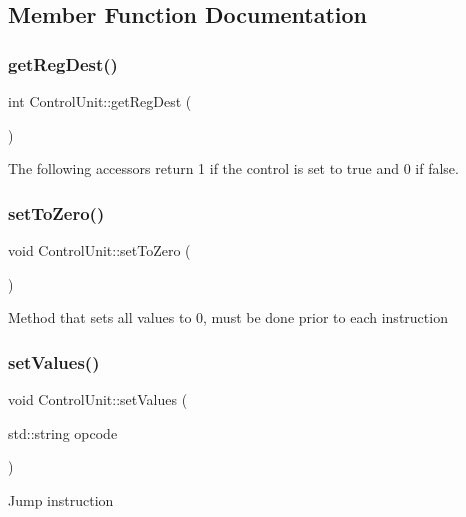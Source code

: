 \subsection{Member Function Documentation}
\mbox{\label{class_control_unit_aeddfdfe24c6ec8c46394949c1a50adc7}} 
\subsubsection{\texorpdfstring{get\+Reg\+Dest()}{getRegDest()}}
{\footnotesize\ttfamily int Control\+Unit\+::get\+Reg\+Dest (\begin{DoxyParamCaption}{ }\end{DoxyParamCaption})}

The following accessors return 1 if the control is set to true and 0 if false. \mbox{\label{class_control_unit_acc570fb783844eb7c25fc0df6163270c}} 
\subsubsection{\texorpdfstring{set\+To\+Zero()}{setToZero()}}
{\footnotesize\ttfamily void Control\+Unit\+::set\+To\+Zero (\begin{DoxyParamCaption}{ }\end{DoxyParamCaption})}

Method that sets all values to 0, must be done prior to each instruction \mbox{\label{class_control_unit_ac8da21614dd49149be858ad36ceb1cb6}} 
\subsubsection{\texorpdfstring{set\+Values()}{setValues()}}
{\footnotesize\ttfamily void Control\+Unit\+::set\+Values (\begin{DoxyParamCaption}\item[{std\+::string}]{opcode }\end{DoxyParamCaption})}

Jump instruction


